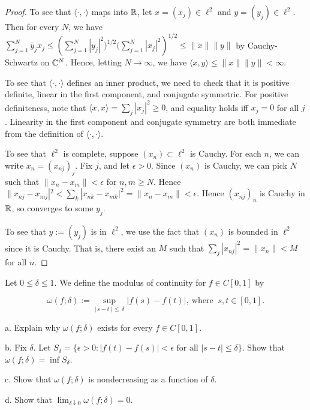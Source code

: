 \documentclass{article}
\begin{document}
\begin{proof}
To see that $\langle \cdot , \cdot \rangle$ maps into $\mathbb{R}$, let $x = (x_j) \in \ell^2$ and $y = (y_j) \in \ell^2$.  Then for every $N$, we have $\sum_{j=1}^N \bar y_j x_j \le \left( \sum_{j=1}^N |y_j|^2)^{1/2} (\sum_{j=1}^N |x_j|^2 \right)^{1/2} \le \|x\| \|y\|$ by Cauchy-Schwartz on $\mathbb{C}^N$.  Hence, letting $N \to \infty$, we have $\langle x, y \rangle \le \|x\| \|y\| < \infty$.

To see that $\langle \cdot, \cdot \rangle$ defines an inner product, we need to check that it is positive definite, linear in the first component, and conjugate symmetric.  For positive definiteness, note that $\langle x, x \rangle = \sum_j |x_j|^2 \ge 0$, and equality holds iff $x_j = 0$ for all $j$.  Linearity in the first component and conjugate symmetry are both immediate from the definition of $\langle \cdot, \cdot \rangle$.

To see that $\ell^2$ is complete, suppose $(x_n) \subset \ell^2$ is Cauchy.  For each $n$, we can write $x_n = (x_{nj})_j$.  Fix $j$, and let $\epsilon > 0$.  Since $(x_n)$ is Cauchy, we can pick $N$ such that $\|x_n - x_m \| < \epsilon$ for $n,m \ge N$.  Hence $\|x_{nj} - x_{mj}|^2 < \sum_k |x_{nk} - x_{mk}|^2 = \|x_n - x_m\| < \epsilon$.  Hence $(x_{nj})_n$ is Cauchy in $\mathbb{R}$, so converges to some $y_j$.  

To see that $y := (y_j)$ is in $\ell^2$, we use the fact that $(x_n)$ is bounded in $\ell^2$ since it is Cauchy.  That is, there exist an $M$ such that $\sum_j |x_{nj}|^2 = \|x_n\| < M$ for all $n$.  


\end{proof}

 Let $0\le \delta \le 1$. We define the modulus of continuity for
$f\in C[0,1]$ by

\[
\omega(f;\delta) := \sup_{|\,s-t\,|\,\le\, \delta}|f(s)-f(t)|,
  \ \text{where }\ s,t \in [0,1].
\]

a. Explain why $\omega(f;\delta)$ exists for every $f\in C[0,1]$.

b. Fix $\delta$. Let $S_\delta = \{ \epsilon > 0 : |f(t) - f(s)| < \epsilon \text{ for all } |s - t| \le \delta \}$.  Show that $\omega (f ; \delta) = \inf S_\delta$.

c. Show that $\omega(f ; \delta)$ is nondecreasing as a function of $\delta$.

d. Show that $\lim_{\delta \downarrow 0} \omega(f; \delta) = 0$.
\end{document}
